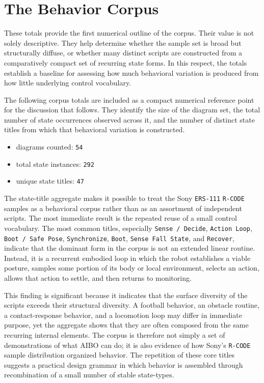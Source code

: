 \documentclass[11pt]{article}
\begin{document}
\section*{The Behavior Corpus}

These totals provide the first numerical outline of the corpus. Their
value is not solely descriptive. They help determine whether the sample
set is broad but structurally diffuse, or whether many distinct scripts
are constructed from a comparatively compact set of recurring state
forms. In this respect, the totals establish a baseline for assessing
how much behavioral variation is produced from how little underlying
control vocabulary.

The following corpus totals are included as a compact numerical
reference point for the discussion that follows. They identify the size
of the diagram set, the total number of state occurrences observed
across it, and the number of distinct state titles from which that
behavioral variation is constructed.

\begin{itemize}
\item diagrams counted: \texttt{54}
\item total state instances: \texttt{292}
\item unique state titles: \texttt{47}
\end{itemize}

The state-title aggregate makes it possible to treat the Sony
\texttt{ERS-111} \texttt{R-CODE} samples as a behavioral corpus rather than
as an assortment of independent scripts. The most immediate result is
the repeated reuse of a small control vocabulary. The most common
titles, especially \texttt{Sense / Decide}, \texttt{Action Loop},
\texttt{Boot / Safe Pose}, \texttt{Synchronize}, \texttt{Boot},
\texttt{Sense Fall State}, and \texttt{Recover}, indicate that the
dominant form in the corpus is not an extended linear routine. Instead,
it is a recurrent embodied loop in which the robot establishes a viable
posture, samples some portion of its body or local environment,
selects an action, allows that action to settle, and then returns to
monitoring.

This finding is significant because it indicates that the surface
diversity of the scripts exceeds their structural diversity. A football
behavior, an obstacle routine, a contact-response behavior, and a
locomotion loop may differ in immediate purpose, yet the aggregate
shows that they are often composed from the same recurring internal
elements. The corpus is therefore not simply a set of demonstrations of
what AIBO can do; it is also evidence of how Sony's \texttt{R-CODE}
sample distribution organized behavior. The repetition of these core
titles suggests a practical design grammar in which behavior is
assembled through recombination of a small number of stable
state-types.
\end{document}
